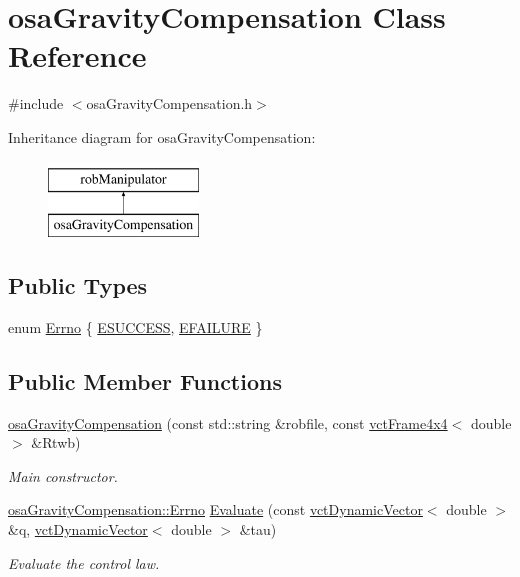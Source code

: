 \hypertarget{classosa_gravity_compensation}{}\section{osa\+Gravity\+Compensation Class Reference}
\label{classosa_gravity_compensation}


{\ttfamily \#include $<$osa\+Gravity\+Compensation.\+h$>$}

Inheritance diagram for osa\+Gravity\+Compensation\+:\begin{figure}[H]
\begin{center}
\leavevmode
\includegraphics[height=2.000000cm]{d2/d17/classosa_gravity_compensation}
\end{center}
\end{figure}
\subsection*{Public Types}
\begin{DoxyCompactItemize}
\item 
enum \hyperlink{classosa_gravity_compensation_a179d78f4a936077a2c75ba01ff9f0331}{Errno} \{ \hyperlink{classosa_gravity_compensation_a179d78f4a936077a2c75ba01ff9f0331a8a21250fa311b657e14fca50d6be30e0}{E\+S\+U\+C\+C\+E\+S\+S}, 
\hyperlink{classosa_gravity_compensation_a179d78f4a936077a2c75ba01ff9f0331a2961d66ff650ae6e10681848900c5491}{E\+F\+A\+I\+L\+U\+R\+E}
 \}
\end{DoxyCompactItemize}
\subsection*{Public Member Functions}
\begin{DoxyCompactItemize}
\item 
\hyperlink{classosa_gravity_compensation_aa2b2a285c799d1722331c00b3a0dd899}{osa\+Gravity\+Compensation} (const std\+::string \&robfile, const \hyperlink{classvct_frame4x4}{vct\+Frame4x4}$<$ double $>$ \&Rtwb)
\begin{DoxyCompactList}\small\item\em Main constructor. \end{DoxyCompactList}\item 
\hyperlink{classosa_gravity_compensation_a179d78f4a936077a2c75ba01ff9f0331}{osa\+Gravity\+Compensation\+::\+Errno} \hyperlink{classosa_gravity_compensation_a018b9d1f7912687cd82ce183c8699cd6}{Evaluate} (const \hyperlink{classvct_dynamic_vector}{vct\+Dynamic\+Vector}$<$ double $>$ \&q, \hyperlink{classvct_dynamic_vector}{vct\+Dynamic\+Vector}$<$ double $>$ \&tau)
\begin{DoxyCompactList}\small\item\em Evaluate the control law. \end{DoxyCompactList}\end{DoxyCompactItemize}
